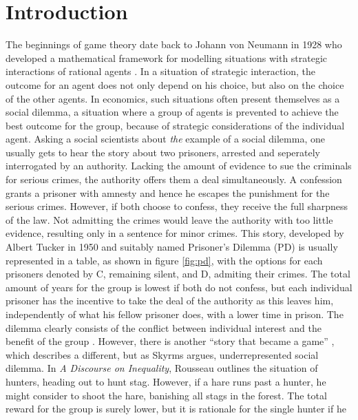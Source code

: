 \documentclass[11pt]{article}
\begin{document}

\tableofcontents
\newpage
\listoffigures
\newpage
{}
\section{Introduction}
The beginnings of game theory date back to Johann von Neumann in 1928 
who developed a mathematical framework
for modelling situations with strategic interactions of rational agents 
\parencite{v._neumann_zur_1928}.
In a situation of strategic interaction, the outcome for an agent does not
only depend on his choice, but also on the choice of the other agents.
In economics, such situations often present themselves as a social dilemma,
a situation where a group of agents is prevented to achieve the best
outcome for the group, because of strategic considerations of the individual
agent.
Asking a social scientists about \textit{the} example of a social dilemma, 
one usually gets to hear the story about two prisoners, arrested and 
seperately interrogated by an authority. Lacking the amount of evidence to sue 
the criminals for serious crimes, the authority offers them a deal 
simultaneously.
A confession grants a prisoner with amnesty and hence he escapes the punishment
for the serious crimes. However, if both choose to confess, they receive the
full sharpness of the law. Not admitting the crimes would leave the authority
with too little evidence, resulting only in a sentence for minor crimes.
This story, developed by Albert Tucker in 1950 and suitably named Prisoner's
Dilemma (PD) is usually represented in a table, as shown in figure \ref{fig:pd}, with
the options for each prisoners denoted by C, remaining silent, and D, admiting
their crimes. 
The total amount of years for the group is lowest if both do not confess, 
but each individual prisoner has the 
incentive to take the deal of the authority as this leaves him, independently
of what his fellow prisoner does, with a lower time in prison. The dilemma 
clearly consists of the conflict between individual interest and 
the benefit of the group \parencite{skyrms_stag_2004}. However, there is 
another ``story that became a game'' \parencite[1]{skyrms_stag_2004}, 
which describes a different, but as Skyrms argues, 
underrepresented social dilemma. In \textit{A Discourse on Inequality}, 
Rousseau outlines the situation of hunters, heading out to hunt 
stag. However, if a hare runs past a hunter, he might consider to
shoot the hare, banishing all stags in the forest. The total reward for
the group is surely lower, but it is rationale for the single hunter if he
\end{document}
